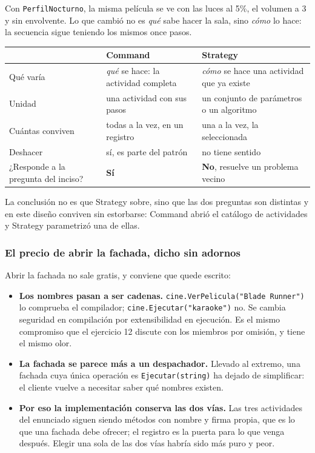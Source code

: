 Con \texttt{PerfilNocturno}, la misma película se ve con las luces al 5\%, el volumen a 3 y
sin envolvente. Lo que cambió no es \emph{qué} sabe hacer la sala, sino \emph{cómo} lo hace:
la secuencia sigue teniendo los mismos once pasos.

\begin{table}[h!]
    \centering
    \small
    \begin{tabular}{p{3.4cm}p{5.4cm}p{5.4cm}}
        \toprule
        & \textbf{Command} & \textbf{Strategy} \\
        \midrule
        Qué varía & \emph{qué} se hace: la actividad completa & \emph{cómo} se hace una
                    actividad que ya existe \\
        \addlinespace
        Unidad & una actividad con sus pasos & un conjunto de parámetros o un algoritmo \\
        \addlinespace
        Cuántas conviven & todas a la vez, en un registro & una a la vez, la seleccionada \\
        \addlinespace
        Deshacer & sí, es parte del patrón & no tiene sentido \\
        \addlinespace
        ¿Responde a la pregunta del inciso? & \textbf{Sí} & \textbf{No}, resuelve un
                    problema vecino \\
        \bottomrule
    \end{tabular}
\end{table}

La conclusión no es que Strategy sobre, sino que las dos preguntas son distintas y en este
diseño conviven sin estorbarse: Command abrió el catálogo de actividades y Strategy
parametrizó una de ellas.

\subsubsection*{El precio de abrir la fachada, dicho sin adornos}

Abrir la fachada no sale gratis, y conviene que quede escrito:

\begin{itemize}[leftmargin=1.2cm]
    \item \textbf{Los nombres pasan a ser cadenas.} \texttt{cine.VerPelicula("Blade Runner")}
          lo comprueba el compilador; \texttt{cine.Ejecutar("karaoke")} no. Se cambia
          seguridad en compilación por extensibilidad en ejecución. Es el mismo compromiso
          que el ejercicio 12 discute con los miembros por omisión, y tiene el mismo olor.
    \item \textbf{La fachada se parece más a un despachador.} Llevado al extremo, una
          fachada cuya única operación es \texttt{Ejecutar(string)} ha dejado de simplificar:
          el cliente vuelve a necesitar saber qué nombres existen.
    \item \textbf{Por eso la implementación conserva las dos vías.} Las tres actividades del
          enunciado siguen siendo métodos con nombre y firma propia, que es lo que una
          fachada debe ofrecer; el registro es la puerta para lo que venga después. Elegir
          una sola de las dos vías habría sido más puro y peor.
\end{itemize}

